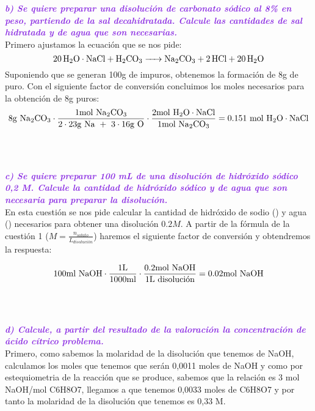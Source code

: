 \clearpage

\noindent\textcolor{BlueViolet}{\textbf{\textit{b) Se quiere preparar una disolución de carbonato sódico al 8\% en peso, partiendo de la sal decahidratada. Calcule las cantidades de sal hidratada y de agua que son necesarias.}}}\\

\noindent Primero ajustamos la ecuación que se nos pide:
\[\ce{20H2O\cdot NaCl + H2CO3 -> Na2CO3 + 2HCl + 20H2O}\]
\noindent Suponiendo que se generan 100\si{g} de  impuros, obtenemos la formación de 8\si{g} de  puro. Con el siguiente factor de conversión concluimos los moles necesarios para la obtención de 8g puros:
\[ 8\si{g}\ \ce{Na2CO3} \cdot \frac{1\ce{mol}\ \ce{Na2CO3}}{2\cdot23\si{g}\ \ce{Na}\ +\ 3\cdot16\si{g}\ \ce{O}} \cdot \frac{2\si{mol}\ \ce{H2O}\cdot\ce{NaCl}}{1\si{mol}\ \ce{Na2CO3}} = 0.151\ \si{mol}\ \ce{H2O}\cdot\ce{NaCl}\]\\\\\\
\noindent\textcolor{BlueViolet}{\textbf{\textit{c) Se quiere preparar 100 mL de una disolución de hidróxido sódico 0,2 M. Calcule la cantidad de hidróxido sódico y de agua que son necesaria para preparar la disolución.}}}\\

\noindent En esta cuestión se nos pide calcular la cantidad de hidróxido de sodio () y agua () necesarios para obtener una disolución $0.2 M$. A partir de la fórmula de la cuestión 1 ($M = \frac{n_{soluto}}{\si{L}_{disolución}}$) haremos el siguiente factor de conversión y obtendremos la respuesta:

\[100\si{ml} \ \ce{NaOH} \cdot \frac{1\si{L}}{1000\si{ml}} \cdot \frac{0.2 \si{mol} \ \ce{NaOH}}{1 \si{L}\ \text{disolución}} = 0.02 \si{mol} \ \ce{NaOH}\]\\\\\\
\noindent\textcolor{BlueViolet}{\textbf{\textit{d) Calcule, a partir del resultado de la valoración la concentración de ácido cítrico problema.}}}\\

\noindent Primero, como sabemos la molaridad de la disolución que tenemos de NaOH,
calculamos los moles que tenemos que serán 0,0011 moles de NaOH y como por
estequiometria de la reacción que se produce, sabemos que la relación es 3 mol
NaOH/mol C6H8O7, llegamos a que tenemos 0,0033 moles de C6H8O7 y por tanto la
molaridad de la disolución que tenemos es 0,33 M.